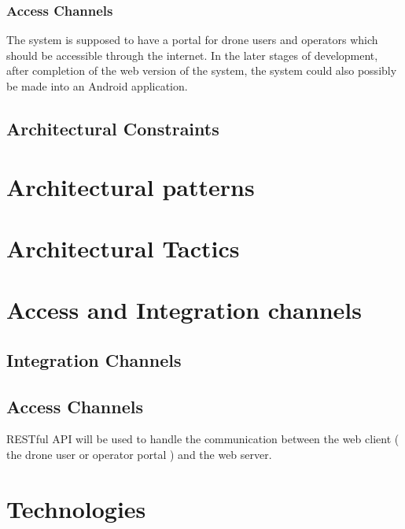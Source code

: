 \documentclass{article}
\begin{document}
		\subsubsection{Access Channels}
		The system is supposed to have a portal for drone users and operators which should be accessible through the internet. In the later stages of development, after completion of the web version of the system, the system could also possibly be made into an Android application.
		\subsection{Architectural Constraints }%
	\section{Architectural patterns}%
	\section{Architectural Tactics}%
	\section{Access and Integration channels}%
	\subsection{Integration Channels}
	\subsection{Access Channels}
	RESTful API will be used to handle the communication between the web client ( the drone user or operator portal ) and the web server. 
	\section{Technologies}%
	
	
	
	
	
	
\end{document}

